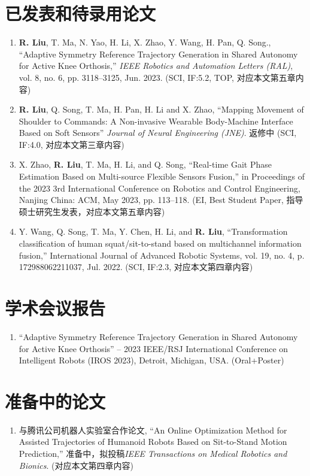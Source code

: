 
\begin{publications}

\section*{已发表和待录用论文}

\begin{enumerate}
\item \textbf{R. Liu}, T. Ma, N. Yao, H. Li, X. Zhao, Y. Wang, H. Pan, Q. Song., “Adaptive Symmetry Reference Trajectory Generation in Shared Autonomy for Active Knee Orthosis,” \textit{IEEE Robotics and Automation Letters (RAL)}, vol. 8, no. 6, pp. 3118–3125, Jun. 2023. (SCI, IF:5.2, TOP, 对应本文第五章内容)
\item \textbf{R. Liu}, Q. Song, T. Ma, H. Pan, H. Li and X. Zhao, ``Mapping Movement of Shoulder to Commands: A Non-invasive Wearable Body-Machine Interface Based on Soft Sensors'' \textit{Journal of Neural Engineering (JNE)}. 返修中 (SCI, IF:4.0, 对应本文第三章内容)
\item X. Zhao, \textbf{R. Liu}, T. Ma, H. Li, and Q. Song, “Real-time Gait Phase Estimation Based on Multi-source Flexible Sensors Fusion,” in Proceedings of the 2023 3rd International Conference on Robotics and Control Engineering, Nanjing China: ACM, May 2023, pp. 113–118. (EI, Best Student Paper, 指导硕士研究生发表，对应本文第五章内容)
\item Y. Wang, Q. Song, T. Ma, Y. Chen, H. Li, and \textbf{R. Liu}, “Transformation classification of human squat/sit-to-stand based on multichannel information fusion,” International Journal of Advanced Robotic Systems, vol. 19, no. 4, p. 172988062211037, Jul. 2022. (SCI, IF:2.3, 对应本文第四章内容)
\end{enumerate}

\section*{学术会议报告}
\begin{enumerate}
\item ``Adaptive Symmetry Reference Trajectory Generation in Shared Autonomy for Active Knee Orthosis'' – 2023 IEEE/RSJ International Conference on Intelligent Robots (IROS 2023), Detroit, Michigan, USA. (Oral+Poster)
\end{enumerate}

\section*{准备中的论文}
\begin{enumerate}
\item 与腾讯公司机器人实验室合作论文, ``An Online Optimization Method for Assisted Trajectories of Humanoid Robots Based on Sit-to-Stand Motion Prediction,'' 准备中，拟投稿\textit{IEEE Transactions on Medical Robotics and Bionics}. (对应本文第四章内容)
\end{enumerate}


\end{publications}
